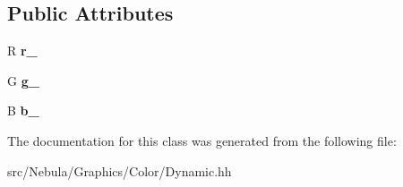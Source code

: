 \subsection*{Public Attributes}
\begin{DoxyCompactItemize}
\item 
\hypertarget{classmath_1_1Color_1_1Dynamic_acff65527ca36b495e192595d4b497498}{R {\bfseries r\-\_\-}}\label{classmath_1_1Color_1_1Dynamic_acff65527ca36b495e192595d4b497498}

\item 
\hypertarget{classmath_1_1Color_1_1Dynamic_a53fcc569fd402f76d834369dc011aaa3}{G {\bfseries g\-\_\-}}\label{classmath_1_1Color_1_1Dynamic_a53fcc569fd402f76d834369dc011aaa3}

\item 
\hypertarget{classmath_1_1Color_1_1Dynamic_ad6f2a9af60170e9f690fdb447b377027}{B {\bfseries b\-\_\-}}\label{classmath_1_1Color_1_1Dynamic_ad6f2a9af60170e9f690fdb447b377027}

\end{DoxyCompactItemize}


The documentation for this class was generated from the following file\-:\begin{DoxyCompactItemize}
\item 
src/\-Nebula/\-Graphics/\-Color/Dynamic.\-hh\end{DoxyCompactItemize}
